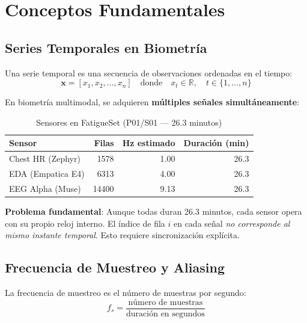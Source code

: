 \documentclass[11pt,twoside,a4paper]{article}
\begin{document}
\section{Conceptos Fundamentales}

\subsection{Series Temporales en Biometría}

Una serie temporal es una secuencia de observaciones ordenadas en el tiempo:
\begin{equation}
\mathbf{x} = [x_1, x_2, \ldots, x_n] \quad \text{donde} \quad x_t \in \mathbb{R}, \quad t \in \{1,\ldots,n\}
\end{equation}

En biometría multimodal, se adquieren \textbf{múltiples señales simultáneamente}:

\begin{table}[H]
\centering
\caption{Sensores en FatigueSet (P01/S01 --- 26.3 minutos)}
\label{tab:sensores}
\begin{tabular}{|l|r|r|r|}
\hline
Sensor & Filas & Hz estimado & Duración (min) \\
\hline
Chest HR (Zephyr) & 1578 & 1.00 & 26.3 \\
\hline
EDA (Empatica E4) & 6313 & 4.00 & 26.3 \\
\hline
EEG Alpha (Muse) & 14400 & 9.13 & 26.3 \\
\hline
\end{tabular}
\end{table}

\textbf{Problema fundamental}: Aunque todas duran 26.3 minutos, cada sensor opera con su propio reloj interno. El índice de fila $i$ en cada señal \textit{no corresponde al mismo instante temporal}. Esto requiere sincronización explícita.

\subsection{Frecuencia de Muestreo y Aliasing}

La frecuencia de muestreo es el número de muestras por segundo:
\begin{equation}
f_s = \frac{\text{número de muestras}}{\text{duración en segundos}}
\end{equation}
\end{document}

